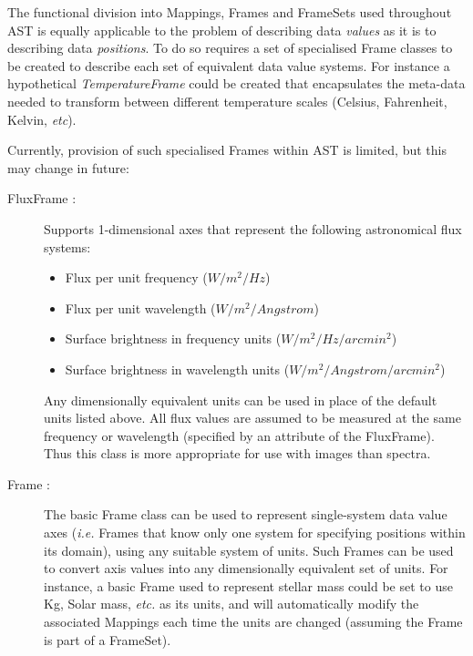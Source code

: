 \documentclass[final,authoryear,5p,times,twocolumn]{elsarticle}
\begin{document}
The functional division into Mappings, Frames and FrameSets  used
throughout AST is equally applicable to the problem of describing data
\emph{values} as it is to describing data \emph{positions}. To do so
requires a set of specialised Frame classes to be created to describe each
set of equivalent data value systems. For instance a hypothetical
\emph{TemperatureFrame} could be created that encapsulates the meta-data
needed to transform between different temperature scales (Celsius, Fahrenheit,
Kelvin, \emph{etc}).

Currently, provision of such specialised Frames within AST is
limited, but this may change in future:

\begin{description}

\item[FluxFrame :] Supports 1-dimensional axes that represent the following
astronomical flux systems:
\begin{itemize}
\item Flux per unit frequency ($W/m^2/Hz$)
\item Flux per unit wavelength ($W/m^2/Angstrom$)
\item Surface brightness in frequency units ($W/m^2/Hz/arcmin^2$)
\item Surface brightness in wavelength units ($W/m^2/Angstrom/arcmin^2$)
\end{itemize}
Any dimensionally equivalent units can be used in place of the default
units listed above. All flux values are assumed to be measured at the
same frequency or wavelength (specified by an attribute of the FluxFrame).
Thus this class is more appropriate for use with images than spectra.

\item[Frame :] The basic Frame class can be used to represent
single-system data value axes (\emph{i.e.} Frames that know only one
system for specifying positions within its domain), using any suitable
system of units. Such Frames can be used to convert axis values into any
dimensionally equivalent set of units. For instance, a basic Frame used
to represent stellar mass could be set to use Kg, Solar mass,
\emph{etc.} as its units, and will automatically modify the associated
Mappings each time the units are changed (assuming the Frame is part of
a FrameSet).

\end{description}
\end{document}
